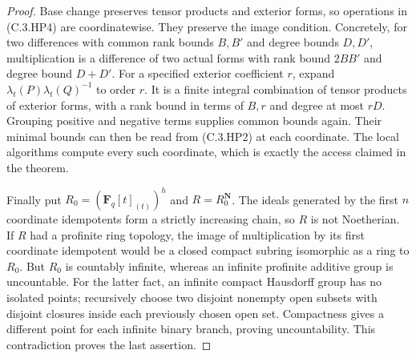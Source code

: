 \begin{proof}
Base change preserves tensor products and exterior
forms, so operations in (C.3.HP4) are coordinatewise.
They preserve the image condition.  Concretely, for
two differences with common rank bounds $B,B'$
and degree bounds $D,D'$, multiplication is a
difference of two actual forms with rank bound
$2BB'$ and degree bound $D+D'$.
For a specified exterior coefficient $r$, expand
$\lambda_t(P)\lambda_t(Q)^{-1}$ to order $r$.
It is a finite integral combination of tensor
products of exterior forms, with a rank bound
in terms of $B,r$ and degree at most $rD$.
Grouping positive and negative terms supplies
common bounds again.  Their minimal bounds can
then be read from (C.3.HP2) at each coordinate.
The local algorithms compute every such coordinate,
which is exactly the access claimed in the theorem.

Finally put $R_0=(\mathbf F_q[t]_{(t)})^h$ and
$R=R_0^{\mathbf N}$.
The ideals generated by the first $n$ coordinate
idempotents form a strictly increasing chain,
so $R$ is not Noetherian.
If $R$ had a profinite ring topology, the image
of multiplication by its first coordinate
idempotent would be a closed compact subring
isomorphic as a ring to $R_0$.
But $R_0$ is countably infinite, whereas an infinite
profinite additive group is uncountable.
For the latter fact, an infinite compact Hausdorff
group has no isolated points; recursively choose
two disjoint nonempty open subsets with disjoint
closures inside each previously chosen open set.
Compactness gives a different point for each
infinite binary branch, proving uncountability.
This contradiction proves the last assertion.
\end{proof}
